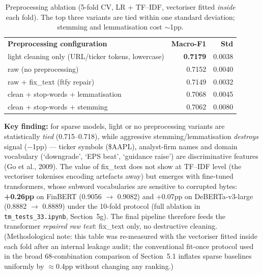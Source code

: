 \documentclass[11pt,a4paper]{article}
\newcommand{\tH}[1]{\textcolor{maincolor}{\textbf{#1}}}
\newcommand{\gmid}{\arrayrulecolor{maincolor}\midrule\arrayrulecolor{black}}
\begin{document}
\begin{table}[H]
  \centering
  \small
  \setlength{\tabcolsep}{8pt}
  \begin{tabularx}{0.86\linewidth}{@{}>{\raggedright\arraybackslash}X r r@{}}
    \toprule
    \tH{Preprocessing configuration} & \tH{Macro-F1} & \tH{Std} \\
    \gmid
    \rowcolor{lightgray} light cleaning only (URL/ticker tokens, lowercase) & \textbf{0.7179} & 0.0038 \\
    raw (no preprocessing)                                   & 0.7152 & 0.0040 \\
    raw + fix\_text (ftfy repair)                            & 0.7149 & 0.0032 \\
    clean + stop-words + lemmatisation                       & 0.7068 & 0.0045 \\
    clean + stop-words + stemming                            & 0.7062 & 0.0080 \\
    \bottomrule
  \end{tabularx}
  \caption{Preprocessing ablation (5-fold CV, LR + TF--IDF, vectoriser fitted \emph{inside} each
  fold). The top three variants are tied within one standard deviation; stemming and lemmatisation
  cost $\sim$1pp.}
  \label{tab:ablation}
\end{table}

\textbf{Key finding:} for sparse models, light or no preprocessing variants are statistically
\emph{tied} (0.715--0.718), while aggressive stemming/lemmatisation \emph{destroys} signal
($-$1pp) --- ticker symbols (\$AAPL), analyst-firm names and domain vocabulary (`downgrade',
`EPS beat', `guidance raise') are discriminative features (Go et al., 2009). The value of
fix\_text does not show at TF--IDF level (the vectoriser tokenises encoding artefacts away) but
emerges with fine-tuned transformers, whose subword vocabularies are sensitive to corrupted bytes:
\textbf{+0.26pp} on FinBERT (0.9056 $\to$ 0.9082) and +0.07pp on DeBERTa-v3-large (0.8882 $\to$
0.8889) under the 10-fold protocol (full ablation in \nolinkurl{tm_tests_33.ipynb}, Section~5g).
The final pipeline therefore feeds the transformer \emph{repaired raw text}: fix\_text only, no
destructive cleaning. (Methodological note: this table was re-measured with the vectoriser fitted
inside each fold after an internal leakage audit; the conventional fit-once protocol used in the
broad 68-combination comparison of Section~5.1 inflates sparse baselines uniformly by
$\approx$0.4pp without changing any ranking.)
\end{document}
